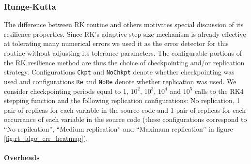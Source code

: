 \documentclass{sig-alternate}
\newcommand{\greg}[1]{%
  \textcolor{blue}{GB: #1}
}
\begin{document}


\subsubsection{Runge-Kutta}
\label{sec:res_tech:eval:rk}

The difference between RK routine and others motivates special discussion of its resilience properties.
Since RK's adaptive step size mechanism is already effective at tolerating many numerical errors we used it as the error detector for this routine without adjusting its tolerance parameters.
The configurable portions of the RK resilience method are thus the choice of checkpointing and/or replication strategy.
Configurations \texttt{Ckpt} and \texttt{NoChkpt} denote whether checkpointing was used and configurations \texttt{Re} and \texttt{NoRe} denote whether replication was used.
We consider checkpointing periods equal to 1, $10^2$, $10^3$, $10^4$ and $10^5$ calls to the RK4 stepping function and the following replication configurations: No replication, 1 pair of replicas for each variable in the source code and 1 pair of replicas for each occurrance of each variable in the source code (these configurations correspond to ``No repilcation'', ``Medium replication'' and ``Maximum replication'' in figure \ref{fig:rt_algo_err_heatmap}).

\paragraph{Overheads}
\end{document}
